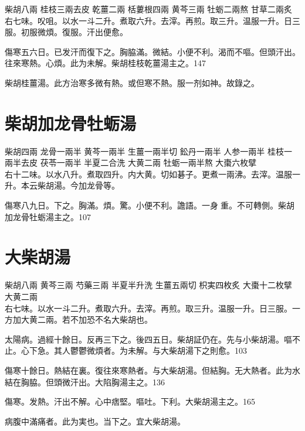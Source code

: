 柴胡{\scriptsize 八兩} 桂枝{\scriptsize 三兩去皮} 乾薑{\scriptsize 二兩} 栝蔞根{\scriptsize 四兩} 黄芩{\scriptsize 三兩} 牡蛎{\scriptsize 二兩熬} 甘草{\scriptsize 二兩炙}\\
右七味。㕮咀。以水一斗二升。煮取六升。去滓。再煎。取三升。温服一升。日三服。初服微煩。{\khaai 復服。}汗出{\khaai 便}愈。

傷寒五六日。已发汗而復下之。胸脇滿。微結。小便不利。渴而不嘔。但頭汗出。往來寒熱。心煩。此为未解。柴胡桂枝乾薑湯主之。147

柴胡桂薑湯。{\scriptsize 此方治寒多微有熱。或但寒不熱。服一剂如神。故錄之。}

\section{柴胡加龙骨牡蛎湯}

柴胡{\scriptsize 四兩} 龙骨{\scriptsize 一兩半} 黄芩{\scriptsize 一兩半} 生薑{\scriptsize 一兩半切} 鈆丹{\scriptsize 一兩半} 人参{\scriptsize 一兩半} 桂枝{\scriptsize 一兩半去皮} 茯苓{\scriptsize 一兩半} 半夏{\scriptsize 二合洗} 大黄{\scriptsize 二兩} 牡蛎{\scriptsize 一兩半熬} 大棗{\scriptsize 六枚擘}\\
右十二味。以水八升。煮取四升。内大黄。切如碁子。更煮一兩沸。去滓。温服一升。本云柴胡湯。今加龙骨等。

傷寒八九日。下之。胸滿。煩。驚。小便不利。譫語。一身{\khaaiii 𥁞}{\khaai 重。}不可轉側。柴胡加龙骨牡蛎湯主之。107

\section{大柴胡湯}

柴胡{\scriptsize 八兩} 黄芩{\scriptsize 三兩} 芍藥{\scriptsize 三兩} 半夏{\scriptsize 半升洗} 生薑{\scriptsize 五兩切} 枳実{\scriptsize 四枚炙} 大棗{\scriptsize 十二枚擘} {\khaai 大黄{\scriptsize 二兩}}\\
右七味。以水一斗二升。煮取六升。去滓。再煎。{\khaai 取三升。}温服一升。日三服。一方加大黄二兩。若不加恐不名大柴胡也。

太陽病。過經十餘日。反再三下之。後四五日。柴胡証仍在。先与小柴胡湯。嘔不止。心下急。其人鬱鬱微煩者。为未解。与大柴胡湯下之則愈。103

傷寒十餘日。熱結在裏。復往來寒熱者。与大柴胡湯。但結胸。无大熱者。此为水結在胸脇。{\khaai 但}頭微汗出。大陷胸湯主之。136

傷寒。发熱。汗出不解。心中痞堅。嘔吐。下利。大柴胡湯主之。165

病腹中滿痛者。此为実也。当下之。宜大柴胡湯。

